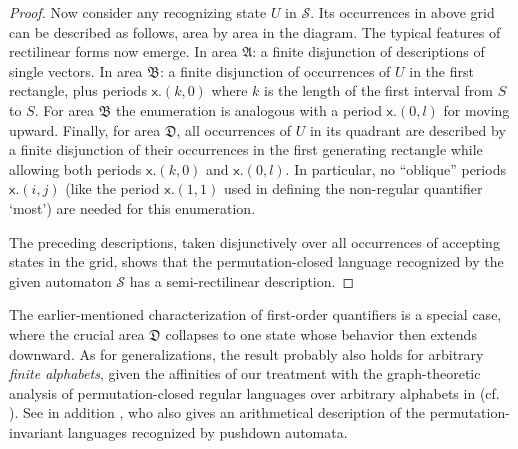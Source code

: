 \documentclass[12pt,oneside,reqno]{amsart}
\theoremstyle{definition}
\begin{document}
\begin{proof}
Now consider any recognizing state $U$ in $\mathcal{S}$. Its occurrences in  above grid can be described as follows, area by area in the diagram. The typical features of rectilinear forms now emerge. In area $\mathfrak{A}$: a finite disjunction of descriptions of single  vectors. In area $\mathfrak{B}$: a finite disjunction of occurrences of $U$ in the first rectangle, plus periods $\mathsf{x}.(k, 0)$ where $k$ is the length of the first interval from $S$ to $S$. For area $\mathfrak{B}$ the enumeration is analogous with a period $\mathsf{x}.(0, l)$ for moving upward. Finally, for area $\mathfrak{D}$, all occurrences of $U$ in its quadrant are described by a finite disjunction of their occurrences in the first generating rectangle while allowing both periods $\mathsf{x}.(k, 0)$ and $\mathsf{x}.(0, l)$. In particular, no ``oblique'' periods $\mathsf{x}.(i, j)$ (like the period $\mathsf{x}.(1, 1)$ used in defining  the non-regular quantifier `most')  are needed for this enumeration.

\vspace{1ex}

The preceding descriptions, taken disjunctively over all occurrences of accepting states in the grid, shows that the permutation-closed language recognized by the given automaton $\mathcal{S}$ has a semi-rectilinear description.        
\end{proof}

The earlier-mentioned characterization of first-order quantifiers \citep{vanBenthem1985} is a special case, 
where the crucial area $\mathfrak{D}$ collapses to one state whose behavior then extends downward. As for generalizations, the result probably also holds for arbitrary \emph{finite alphabets}, given the affinities of our treatment with the graph-theoretic analysis of permutation-closed regular languages over arbitrary alphabets in \cite{Hoffman} (cf. \citealt{EHRENFEUCHT1983311}). See in addition \cite{Kanazawa}, who also gives an arithmetical description of the permutation-invariant languages recognized by pushdown automata.
\end{document}
